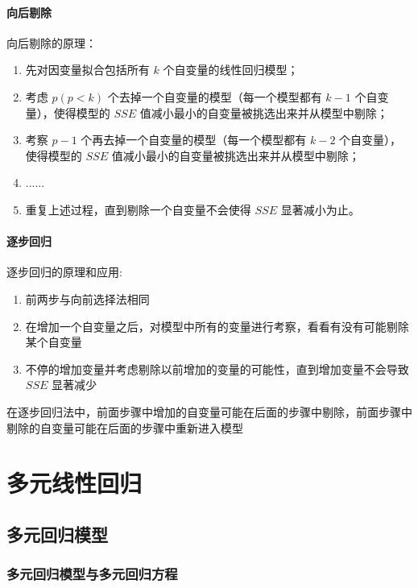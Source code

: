 \documentclass[UTF8,10pt]{book}
\begin{document}
\subsubsection{向后剔除}\label{header-n301}

向后剔除的原理：

\begin{enumerate}
	\def\labelenumi{\arabic{enumi}.}
	\item
	先对因变量拟合包括所有 \(k\) 个自变量的线性回归模型；
	\item
	考虑 \(p(p<k)\) 个去掉一个自变量的模型（每一个模型都有 \(k-1\)
	个自变量），使得模型的 \(SSE\)
	值减小最小的自变量被挑选出来并从模型中剔除；
	\item
	考察 \(p-1\) 个再去掉一个自变量的模型（每一个模型都有 \(k-2\)
	个自变量），使得模型的 \(SSE\)
	值减小最小的自变量被挑选出来并从模型中剔除；
	\item
	......
	\item
	重复上述过程，直到剔除一个自变量不会使得 \(SSE\) 显著减小为止。
\end{enumerate}

\subsubsection{逐步回归}\label{header-n314}

逐步回归的原理和应用:

\begin{enumerate}
	\def\labelenumi{\arabic{enumi}.}
	\item
	前两步与向前选择法相同
	\item
	在增加一个自变量之后，对模型中所有的变量进行考察，看看有没有可能剔除某个自变量
	\item
	不停的增加变量并考虑剔除以前增加的变量的可能性，直到增加变量不会导致
	\(SSE\) 显著减少
\end{enumerate}

在逐步回归法中，前面步骤中增加的自变量可能在后面的步骤中剔除，前面步骤中剔除的自变量可能在后面的步骤中重新进入模型
\clearpage

\chapter{多元线性回归}


\section{多元回归模型}
\subsection{多元回归模型与多元回归方程}
\end{document}
